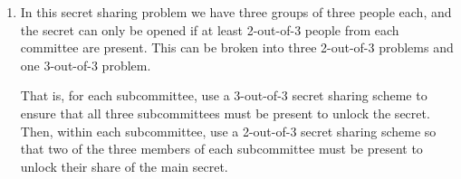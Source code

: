 \documentclass[12pt,letterpaper]{article}
\begin{document}
\begin{enumerate}
  \item In this secret sharing problem we have three groups of three people
    each, and the secret can only be opened if at least 2-out-of-3 people from
    each committee are present. This can be broken into three 2-out-of-3
    problems and one 3-out-of-3 problem.

    That is, for each subcommittee, use a 3-out-of-3 secret sharing scheme to
    ensure that all three subcommittees must be present to unlock the secret.
    Then, within each subcommittee, use a 2-out-of-3 secret sharing scheme so
    that two of the three members of each subcommittee must be present to unlock
    their share of the main secret.
\end{enumerate}
\end{document}

